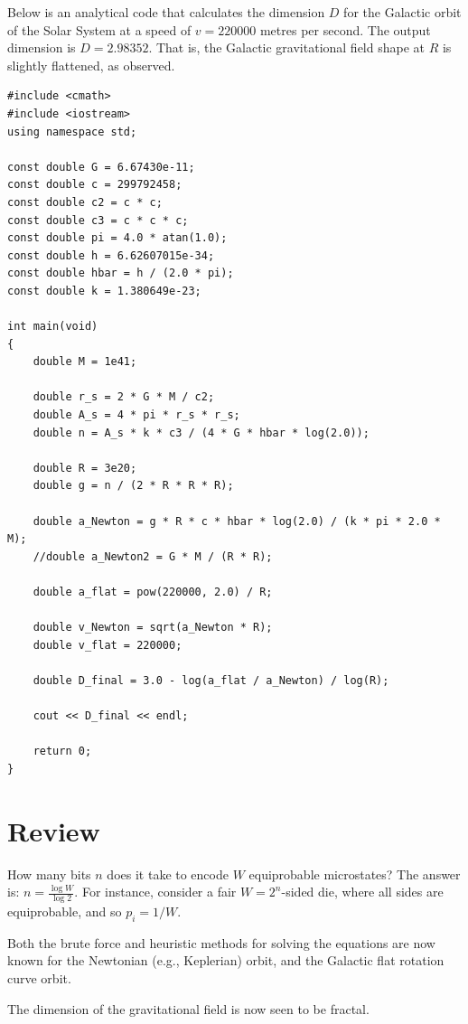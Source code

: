 \documentclass[12pt]{article}
\begin{document}
Below is an analytical code that calculates the dimension $D$ for the Galactic orbit of the Solar System at a speed of $v = 220000$ metres per second.
The output dimension is $D = 2.98352$.
That is, the Galactic gravitational field shape at $R$ is slightly flattened, as observed.
\begin{lstlisting}
#include <cmath>
#include <iostream>
using namespace std;

const double G = 6.67430e-11;
const double c = 299792458;
const double c2 = c * c;
const double c3 = c * c * c;
const double pi = 4.0 * atan(1.0);
const double h = 6.62607015e-34;
const double hbar = h / (2.0 * pi);
const double k = 1.380649e-23;

int main(void)
{
	double M = 1e41;

	double r_s = 2 * G * M / c2;
	double A_s = 4 * pi * r_s * r_s;
	double n = A_s * k * c3 / (4 * G * hbar * log(2.0));

	double R = 3e20;
	double g = n / (2 * R * R * R);

	double a_Newton = g * R * c * hbar * log(2.0) / (k * pi * 2.0 * M);
	//double a_Newton2 = G * M / (R * R);

	double a_flat = pow(220000, 2.0) / R;

	double v_Newton = sqrt(a_Newton * R);
	double v_flat = 220000;

	double D_final = 3.0 - log(a_flat / a_Newton) / log(R);

	cout << D_final << endl;

	return 0;
}
\end{lstlisting}




\section{Review}

How many bits $n$ does it take to encode $W$ equiprobable microstates?
The answer is: $n = \frac{\log W}{\log 2}$.
For instance, consider a fair $W = 2^n$-sided die, where all sides are equiprobable, and so $p_i = 1/W$.

Both the brute force and heuristic methods for solving the equations are now known for the Newtonian (e.g., Keplerian) orbit, and the Galactic flat rotation curve orbit.

The dimension of the gravitational field is now seen to be fractal.
\end{document}
